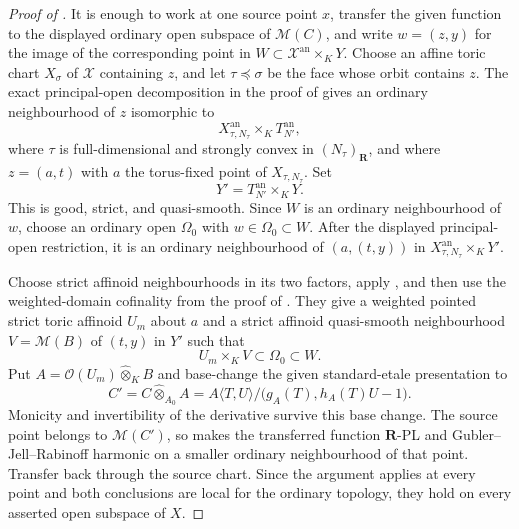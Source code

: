 \begin{proof}[Proof of
]
It is enough to work at one source point \(x\), transfer the given
function to the displayed ordinary open subspace of \(\mathcal M(C)\),
and write \(w=(z,y)\) for the image of the corresponding point in
\(W\subset\mathcal X^{\mathrm{an}}\times_KY\).  Choose an affine toric
chart \(X_\sigma\) of \(\mathcal X\) containing \(z\), and let
\(\tau\preceq\sigma\) be the face whose orbit contains \(z\).  The exact
principal-open decomposition in the proof of
 gives an ordinary neighbourhood of
\(z\) isomorphic to
\[
 X_{\tau,N_\tau}^{\mathrm{an}}\times_KT_{N'}^{\mathrm{an}},
\]
where \(\tau\) is full-dimensional and strongly convex in
\((N_\tau)_{\mathbf R}\), and where \(z=(a,t)\) with \(a\) the
torus-fixed point of \(X_{\tau,N_\tau}\).  Set
\[
                         Y'=T_{N'}^{\mathrm{an}}\times_KY.
\]
This is good, strict, and quasi-smooth.  Since \(W\) is an ordinary
neighbourhood of \(w\), choose an ordinary open \(\Omega_0\) with
\(w\in\Omega_0\subset W\).  After the displayed principal-open
restriction, it is an ordinary neighbourhood of \((a,(t,y))\) in
\(X_{\tau,N_\tau}^{\mathrm{an}}\times_KY'\).

Choose strict affinoid neighbourhoods in its two factors, apply
, and then use the weighted-domain
cofinality from the proof of
.  They give a weighted
pointed strict toric affinoid \(U_m\) about \(a\) and a strict affinoid
quasi-smooth neighbourhood \(V=\mathcal M(B)\) of \((t,y)\) in \(Y'\)
such that
\[
                  U_m\times_KV\subset\Omega_0\subset W.
\]
Put \(A=\mathcal O(U_m)\widehat\otimes_KB\) and base-change the given
standard-etale presentation to
\[
 C'=C\widehat\otimes_{A_0}A
   =A\langle T,U\rangle/
        \bigl(g_A(T),h_A(T)U-1\bigr).
\]
Monicity and invertibility of the derivative survive this base change.  The
source point belongs to \(\mathcal M(C')\), so
 makes the
transferred function \(\mathbf R\)-PL and
Gubler--Jell--Rabinoff harmonic on a smaller ordinary neighbourhood of
that point.  Transfer back through the source chart.  Since the argument
applies at every point and both conclusions are local for the ordinary
topology, they hold on every asserted open subspace of \(X\).
\end{proof}

